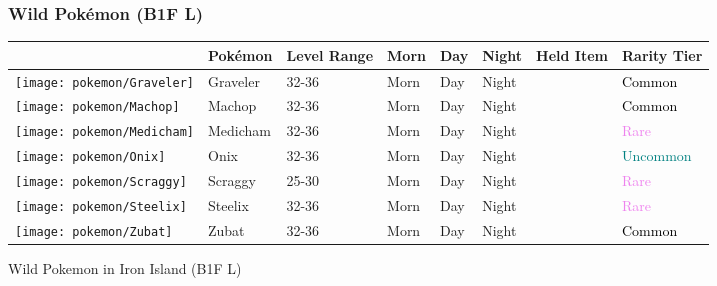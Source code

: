 \subsubsection{Wild Pokémon (B1F L)}%
\label{ssubsec:WildPokmon(B1FL)}%
\begin{longtable}{||l l l l l l l l||}%
\hline%
&Pokémon&Level Range&Morn&Day&Night&Held Item&Rarity Tier\\%
\hline%
\endhead%
\hline%
\texttt{[image: pokemon/Graveler]}&Graveler&32{-}36&Morn&Day&Night&&\textcolor{black}{%
Common%
}\\%
\hline%
\texttt{[image: pokemon/Machop]}&Machop&32{-}36&Morn&Day&Night&&\textcolor{black}{%
Common%
}\\%
\hline%
\texttt{[image: pokemon/Medicham]}&Medicham&32{-}36&Morn&Day&Night&&\textcolor{violet}{%
Rare%
}\\%
\hline%
\texttt{[image: pokemon/Onix]}&Onix&32{-}36&Morn&Day&Night&&\textcolor{teal}{%
Uncommon%
}\\%
\hline%
\texttt{[image: pokemon/Scraggy]}&Scraggy&25{-}30&Morn&Day&Night&&\textcolor{violet}{%
Rare%
}\\%
\hline%
\texttt{[image: pokemon/Steelix]}&Steelix&32{-}36&Morn&Day&Night&&\textcolor{violet}{%
Rare%
}\\%
\hline%
\texttt{[image: pokemon/Zubat]}&Zubat&32{-}36&Morn&Day&Night&&\textcolor{black}{%
Common%
}\\%
\hline%
\end{longtable}%
\caption{Wild Pokemon in Iron Island (B1F L)}